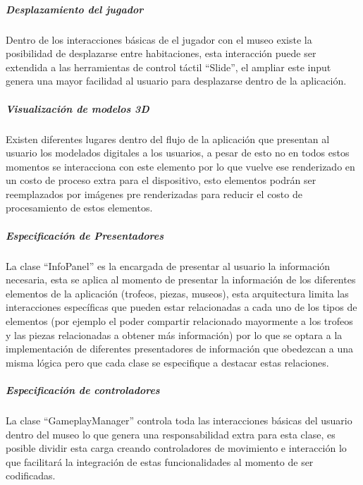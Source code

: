 \documentclass[12pt]{article}
\makeatletter
\renewcommand\paragraph{\@startsection{paragraph}{4}{\z@}%
	{-2.5ex\@plus -1ex \@minus -.25ex}%
	{1.25ex \@plus .25ex}%
	{\normalfont\normalsize\bfseries}}
\makeatother
\begin{document}
\subparagraph{\textbf{Desplazamiento del jugador}}
Dentro de los interacciones básicas de el jugador con el museo existe la posibilidad de desplazarse entre habitaciones, esta interacción puede ser extendida a las herramientas de control táctil “Slide”, el ampliar este input genera una mayor facilidad al usuario para desplazarse dentro de la aplicación.

\subparagraph{\textbf{Visualización de modelos 3D}}
Existen diferentes lugares dentro del flujo de la aplicación que presentan al usuario los modelados digitales a los usuarios, a pesar de esto no en todos estos momentos se interacciona con este elemento por lo que vuelve ese renderizado en un costo de proceso extra para el dispositivo, esto elementos podrán ser reemplazados por imágenes pre renderizadas para reducir el costo de procesamiento de estos elementos.

\subparagraph{\textbf{Especificación de Presentadores}}
La clase “InfoPanel” es la encargada de presentar  al usuario la información necesaria, esta se aplica al momento de presentar la información de los diferentes elementos de la aplicación (trofeos, piezas, museos), esta arquitectura limita las interacciones específicas que pueden estar relacionadas a cada uno de los tipos de elementos (por ejemplo el poder compartir relacionado mayormente a los trofeos y las piezas relacionadas a obtener más información) por lo que se optara a la implementación de diferentes presentadores de información que obedezcan a una misma lógica pero que cada clase se especifique a destacar estas relaciones.

\subparagraph{\textbf{Especificación de controladores}}
La clase “GameplayManager” controla toda las interacciones básicas del usuario dentro del museo lo que genera una responsabilidad extra para esta clase, es posible dividir esta carga creando controladores de movimiento e interacción lo que facilitará la integración de estas funcionalidades al momento de ser codificadas.



\newpage


\newpage

\end{document}
